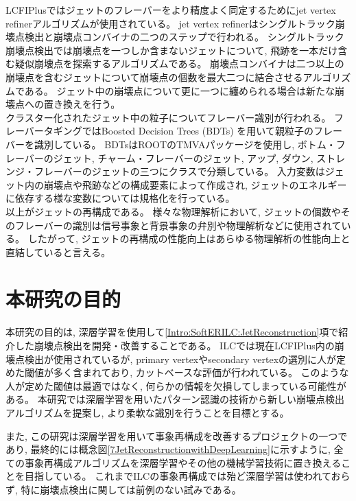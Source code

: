 LCFIPlusではジェットのフレーバーをより精度よく同定するためにjet vertex refinerアルゴリズムが使用されている。
jet vertex refinerはシングルトラック崩壊点検出と崩壊点コンバイナの二つのステップで行われる。
シングルトラック崩壊点検出では崩壊点を一つしか含まないジェットについて, 飛跡を一本だけ含む疑似崩壊点を探索するアルゴリズムである。
崩壊点コンバイナは二つ以上の崩壊点を含むジェットについて崩壊点の個数を最大二つに結合させるアルゴリズムである。
ジェット中の崩壊点について更に一つに纏められる場合は新たな崩壊点への置き換えを行う。\\

クラスター化されたジェット中の粒子についてフレーバー識別が行われる。
フレーバータギングではBoosted Decision Trees (BDTs) を用いて親粒子のフレーバーを識別している。
BDTsはROOTのTMVAパッケージを使用し, ボトム・フレーバーのジェット, チャーム・フレーバーのジェット, アップ, ダウン, ストレンジ・フレーバーのジェットの三つにクラスで分類している。
入力変数はジェット内の崩壊点や飛跡などの構成要素によって作成され, ジェットのエネルギーに依存する様な変数については規格化を行っている。\\

以上がジェットの再構成である。
様々な物理解析において, ジェットの個数やそのフレーバーの識別は信号事象と背景事象の弁別や物理解析などに使用されている。
したがって, ジェットの再構成の性能向上はあらゆる物理解析の性能向上と直結していると言える。


\section{本研究の目的} \label{Intro:Purpose}

本研究の目的は, 深層学習を使用して\ref{Intro:SoftERILC:JetReconstruction}項で紹介した崩壊点検出を開発・改善することである。
ILCでは現在LCFIPlus内の崩壊点検出が使用されているが, primary vertexやsecondary vertexの選別に人が定めた閾値が多く含まれており, カットベースな評価が行われている。
このような人が定めた閾値は最適ではなく, 何らかの情報を欠損してしまっている可能性がある。
本研究では深層学習を用いたパターン認識の技術から新しい崩壊点検出アルゴリズムを提案し, より柔軟な識別を行うことを目標とする。

また, この研究は深層学習を用いて事象再構成を改善するプロジェクトの一つであり, 最終的には概念図\ref{7JetReconstructionwithDeepLearning}に示すように, 全ての事象再構成アルゴリズムを深層学習やその他の機械学習技術に置き換えることを目指している。
これまでILCの事象再構成では殆ど深層学習は使われておらず, 特に崩壊点検出に関しては前例のない試みである。

